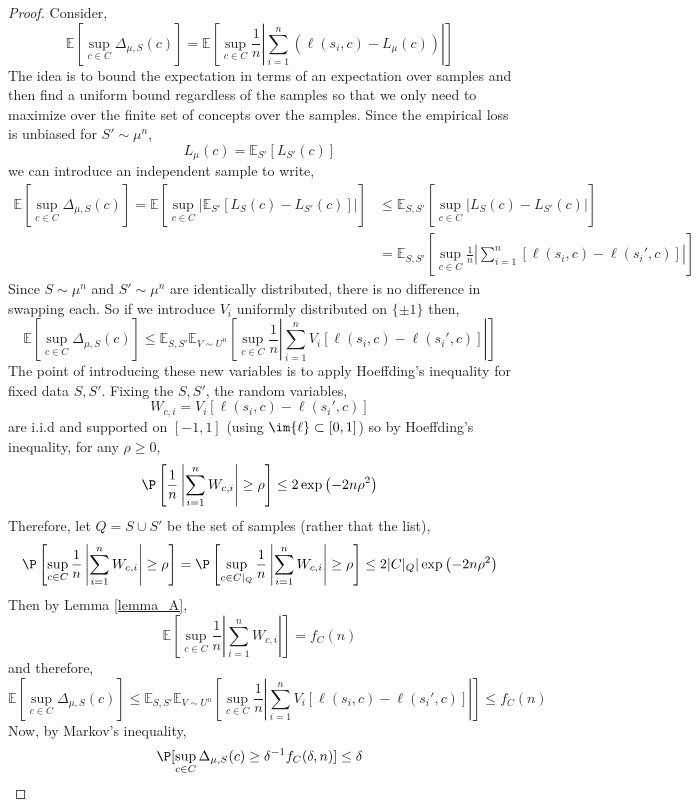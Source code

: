 \documentclass[12pt]{article}
\renewcommand{\E}{\mathbb{E}}
\begin{document}
\begin{proof}
Consider,
\[ \E[\sup_{c \in C} \Delta_{\mu, S}(c)] = \E \left[ \sup_{c \in C} \frac{1}{n} \left| \sum_{i = 1}^n (\ell(s_i, c) - L_\mu(c)) \right| \right] \]
The idea is to bound the expectation in terms of an expectation over samples and then find a uniform bound regardless of the samples so that we only need to maximize over the finite set of concepts over the samples. 
Since the empirical loss is unbiased for $S' \sim \mu^n$,
\[ L_\mu(c) = \E_{S'}[L_{S'}(c)] \]
we can introduce an independent sample to write,
\begin{align*}
\E[\sup_{c \in C} \Delta_{\mu, S}(c)] = \E \left[ \sup_{c \in C} \big| \E_{S'}[L_S(c) - L_{S'}(c)] \big| \right] & \le \E_{S,S'} \left[ \sup_{c \in C} \big|L_S(c) - L_{S'}(c) \big| \right] 
\\
& = \E_{S,S'} \left[ \sup_{c \in C} \frac{1}{n} \left| \sum_{i = 1}^n [\ell(s_i, c) - \ell(s_i', c)] \right| \right]
\end{align*}
Since $S \sim \mu^n$ and $S' \sim \mu^n$ are identically distributed, there is no difference in swapping each. So if we introduce $V_i$ uniformly distributed on $\{ \pm 1 \}$ then,
\[ \E[\sup_{c \in C} \Delta_{\mu, S}(c)] \le \E_{S,S'} \E_{V \sim U^n} \left[ \sup_{c \in C} \frac{1}{n} \left| \sum_{i = 1}^n V_i [\ell(s_i, c) - \ell(s_i', c)] \right| \right] \]
The point of introducing these new variables is to apply Hoeffding’s inequality for fixed data $S, S'$. Fixing the $S, S'$, the random variables,
\[ W_{c, i} = V_i [\ell(s_i, c) - \ell(s_i', c)] \]
are i.i.d and supported on $[-1,1]$ (using $\im{\ell} \subset [0,1]$) so by Hoeffding’s inequality, for any $\rho \ge 0$,
\[ \P\left[ \frac{1}{n} \left| \sum_{i = 1}^n W_{c,i} \right| \ge \rho \right] \le 2 \exp{\left(- 2 n \rho^2 \right)} \]
Therefore, let $Q = S \cup S'$ be the set of samples (rather that the list),
\[ \P\left[ \sup_{c \in C} \frac{1}{n} \left| \sum_{i = 1}^n W_{c,i} \right| \ge \rho \right] = \P\left[ \sup_{c \in C|_Q} \frac{1}{n} \left| \sum_{i = 1}^n W_{c,i} \right| \ge \rho \right] \le 2 |C|_Q| \exp{\left(- 2 n \rho^2 \right)}  \]
Then by Lemma \ref{lemma_A},
\[  \E\left[ \sup_{c \in C} \frac{1}{n} \left| \sum_{i = 1}^n W_{c,i} \right| \right] = f_C(n) \]
and therefore, 
\[ \E[\sup_{c \in C} \Delta_{\mu, S}(c)] \le \E_{S,S'} \E_{V \sim U^n} \left[ \sup_{c \in C} \frac{1}{n} \left| \sum_{i = 1}^n V_i [\ell(s_i, c) - \ell(s_i', c)] \right| \right] \le f_C(n) \]
Now, by Markov's inequality,
\[ \P[\sup_{c \in C} \Delta_{\mu, S}(c) \ge \delta^{-1} f_C(\delta, n)] \le \delta \]
\end{proof}
\end{document}
